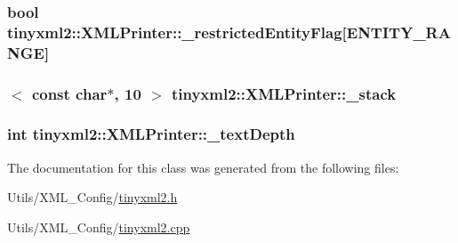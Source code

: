 \hypertarget{classtinyxml2_1_1_x_m_l_printer_a5df242509d42ae1c9128924121ebe093}{
\subsubsection[{\-\_\-restricted\-Entity\-Flag}]{\setlength{\rightskip}{0pt plus 5cm}bool tinyxml2\-::\-X\-M\-L\-Printer\-::\-\_\-restricted\-Entity\-Flag\mbox{[}{\bf E\-N\-T\-I\-T\-Y\-\_\-\-R\-A\-N\-G\-E}\mbox{]}\hspace{0.3cm}{\ttfamily [private]}}}\label{classtinyxml2_1_1_x_m_l_printer_a5df242509d42ae1c9128924121ebe093}
\hypertarget{classtinyxml2_1_1_x_m_l_printer_a99d59e67e084714541bee3ae43884bef}{
\subsubsection[{\-\_\-stack}]{$<$ const char$\ast$, 10 $>$ tinyxml2\-::\-X\-M\-L\-Printer\-::\-\_\-stack\hspace{0.3cm}{\ttfamily [protected]}}}\label{classtinyxml2_1_1_x_m_l_printer_a99d59e67e084714541bee3ae43884bef}
\hypertarget{classtinyxml2_1_1_x_m_l_printer_a3c5a442e57131faefde97188e92144f3}{
\subsubsection[{\-\_\-text\-Depth}]{\setlength{\rightskip}{0pt plus 5cm}int tinyxml2\-::\-X\-M\-L\-Printer\-::\-\_\-text\-Depth\hspace{0.3cm}{\ttfamily [private]}}}\label{classtinyxml2_1_1_x_m_l_printer_a3c5a442e57131faefde97188e92144f3}


The documentation for this class was generated from the following files\-:\begin{DoxyCompactItemize}
\item 
Utils/\-X\-M\-L\-\_\-\-Config/\hyperlink{tinyxml2_8h}{tinyxml2.\-h}\item 
Utils/\-X\-M\-L\-\_\-\-Config/\hyperlink{tinyxml2_8cpp}{tinyxml2.\-cpp}\end{DoxyCompactItemize}
